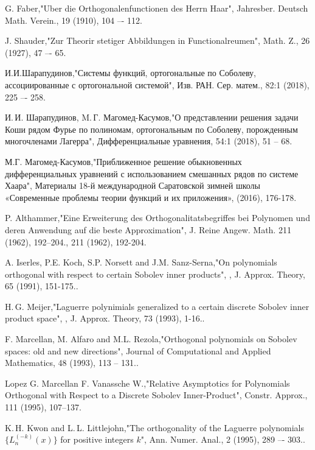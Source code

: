 \begin{thebibliography}{99}

G. Faber,"Uber die Orthogonalenfunctionen des Herrn Haar", Jahresber. Deutsch Math. Verein., 19 (1910), 104 –- 112.


J. Shauder,"Zur Theorir stetiger Abbildungen in Functionalreumen", Math. Z., 26 (1927), 47 –- 65.


И.И.Шарапудинов,"Системы функций, ортогональные по Соболеву, ассоциированные с ортогональной системой", Изв. РАН. Сер. матем., 82:1 (2018), 225 –- 258.


И.\,И. Шарапудинов, M.\,Г. Магомед-Касумов,"О представлении решения задачи Коши  рядом Фурье  по полиномам, ортогональным по  Соболеву, порожденным многочленами Лагерра", Дифференциальные уравнения, 54:1 (2018), 51 -- 68.


М.Г. Магомед-Касумов,"Приближенное решение обыкновенных дифференциальных уравнений с использованием смешанных рядов по системе Хаара", Материалы 18-й международной Саратовской зимней школы «Современные проблемы теории функций и их приложения»,  (2016), 176-178.


P. Althammer,"Eine Erweiterung des Orthogonalitatsbegriffes bei Polynomen und deren Anwendung  auf die beste Approximation", J. Reine Angew. Math. 211 (1962), 192–204., 211 (1962), 192-204.


A. Iserles, P.E. Koch, S.P. Norsett and J.M. Sanz-Serna,"On polynomials  orthogonal  with respect  to certain Sobolev inner products", ,  J. Approx. Theory, 65 (1991), 151-175..


H.\,G. Meijer,"Laguerre polynimials generalized to a certain discrete Sobolev inner product space", ,  J. Approx. Theory, 73 (1993), 1-16..


F. Marcellan, M. Alfaro and M.L. Rezola,"Orthogonal polynomials on Sobolev spaces: old and new directions", Journal of Computational and Applied Mathematics, 48 (1993), 113 -- 131..


Lopez G. Marcellan F. Vanassche W.,"Relative Asymptotics for Polynomials Orthogonal with Respect to a Discrete Sobolev Inner-Product", Constr. Approx., 111 (1995), 107–137.


K.\,H. Kwon and L.\,L. Littlejohn,"The orthogonality of the Laguerre polynomials $\{L_n^{(-k)}(x)\}$ for positive integers $k$", Ann. Numer. Anal., 2 (1995), 289 –- 303..



\end{thebibliography}
